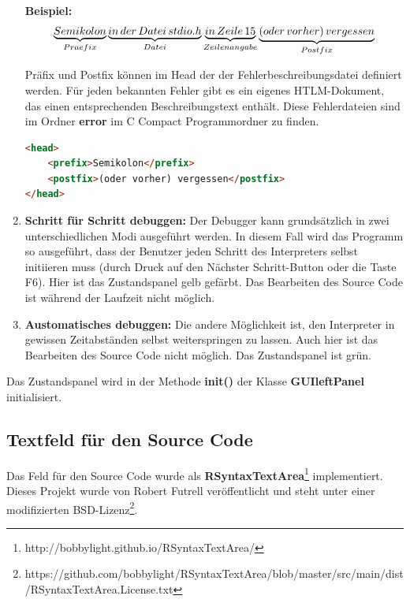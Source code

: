 \begin{enumerate}
\textbf{Beispiel:}
\[
\underbrace{Semikolon}_{Praefix} \underbrace{in\thinspace der\thinspace Datei\thinspace stdio.h}_{Datei} \underbrace{in\thinspace Zeile\thinspace 15}_{Zeilenangabe} \underbrace{(oder\thinspace vorher)\thinspace vergessen}_{Postfix}
\]

Präfix und Postfix können im Head der der Fehlerbeschreibungsdatei definiert werden. Für jeden bekannten Fehler gibt es ein eigenes HTLM-Dokument, das einen entsprechenden Beschreibungstext enthält. Diese Fehlerdateien sind im Ordner \textbf{error} im C Compact Programmordner zu finden.

\begin{lstlisting}[language=HTML]
<head>
	<prefix>Semikolon</prefix>
	<postfix>(oder vorher) vergessen</postfix>
</head>
\end{lstlisting}

\item \textbf{Schritt für Schritt debuggen:} Der Debugger kann grundsätzlich in zwei unterschiedlichen Modi ausgeführt werden. In diesem Fall wird das Programm so ausgeführt, dass der Benutzer jeden Schritt des Interpreters selbst initiieren muss (durch Druck auf den \glqq{}Nächster Schritt\grqq{}-Button oder die Taste F6). Hier ist das Zustandspanel gelb gefärbt. Das Bearbeiten des Source Code ist während der Laufzeit nicht möglich.

\item \textbf{Austomatisches debuggen:} Die andere Möglichkeit ist, den Interpreter in gewissen Zeitabständen selbst weiterspringen zu lassen. Auch hier ist das Bearbeiten des Source Code nicht möglich. Das Zustandspanel ist grün.
\end{enumerate}

Das Zustandspanel wird in der Methode \textbf{init()} der Klasse \textbf{GUIleftPanel} initialisiert.

\subsection{Textfeld für den Source Code}
\label{sec:gui-main-left-code}
Das Feld für den Source Code wurde als \textbf{RSyntaxTextArea}\footnote{http://bobbylight.github.io/RSyntaxTextArea/} implementiert. Dieses Projekt wurde von Robert Futrell veröffentlicht und steht unter einer modifizierten BSD-Lizenz\footnote{https://github.com/bobbylight/RSyntaxTextArea/blob/master/src/main/dist/RSyntaxTextArea.License.txt}.

